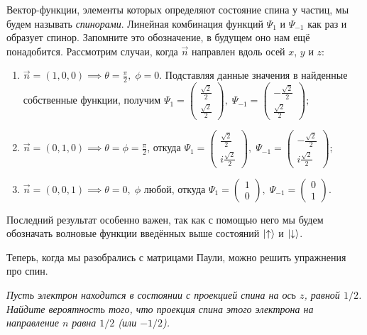 Вектор-функции, элементы которых определяют состояние спина у частиц, мы будем
называть \textit{спинорами}. Линейная комбинация функций $\Psi_1$ и $\Psi_{-1}$
как раз и образует спинор. Запомните это обозначение, в будущем оно нам ещё
понадобится. Рассмотрим случаи, когда $\Vec{n}$ направлен вдоль осей $x$, $y$ и
$z$:
\begin{enumerate}
  \item $\Vec{n} = (1, 0, 0) \implies \theta = \frac{\pi}{2}, \; \phi = 0.$ Подставляя
        данные значения в найденные собственные функции, получим $\Psi_1 = \begin{pmatrix}\frac{\sqrt{2}}{2} \\ \frac{\sqrt{2}}{2}\end{pmatrix}, \; \Psi_{-1} = \begin{pmatrix} -\frac{\sqrt{2}}{2} \\ \frac{\sqrt{2}}{2}\end{pmatrix};$
  \item $\Vec{n} = (0, 1, 0) \implies \theta = \phi = \frac{\pi}{2}$, откуда $\Psi_1 = \begin{pmatrix} \frac{\sqrt{2}}{2} \\ i\frac{\sqrt{2}}{2} \end{pmatrix}, \; \Psi_{-1} = \begin{pmatrix} -\frac{\sqrt{2}}{2} \\ i\frac{\sqrt{2}}{2} \end{pmatrix};$
  \item $\Vec{n} = (0, 0, 1) \implies \theta = 0, \; \phi$ любой, откуда $\Psi_1 = \begin{pmatrix} 1 \\ 0 \end{pmatrix}, \;
          \Psi_{-1} = \begin{pmatrix} 0 \\ 1 \end{pmatrix}.$
\end{enumerate}
Последний результат особенно важен, так как с помощью него мы будем обозначать
волновые функции введённых выше состояний $\lvert\uparrow\rangle$ и
$\lvert\downarrow\rangle$.
\qedsq

Теперь, когда мы разобрались с матрицами Паули, можно решить упражнения про
спин.
\begin{exercise}
  \textit{Пусть электрон находится в состоянии с проекцией спина на ось $z$,
    равной $1/2$. Найдите вероятность того, что проекция спина этого электрона на
    направление $n$ равна $1/2$ (или $-1/2$).}
\end{exercise}

